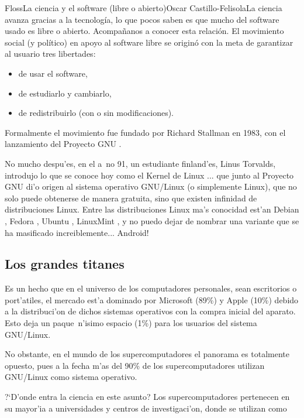 \begin{article}[2]{Floss}{La ciencia y el software (libre o abierto)}{Oscar Castillo-Felisola}{La ciencia avanza gracias a la tecnolog\'ia, lo que pocos saben es que mucho del software usado es libre o abierto. Acompa\~nanos a conocer esta relaci\'on.}
El movimiento social (y pol\'itico)  en apoyo al software libre se origin\'o con la meta de garantizar al usuario tres libertades:
\begin{itemize}%
\item de usar el software,
\item de estudiarlo y cambiarlo,
\item de redistribuirlo (con o sin modificaciones).
\end{itemize}%
Formalmente el movimiento fue fundado por Richard Stallman en 1983, con el lanzamiento del Proyecto GNU .

No mucho despu'es, en el  a~no 91, un estudiante finland'es, Linus Torvalds, introdujo lo que se conoce hoy como el Kernel de Linux ... que junto al Proyecto GNU di'o origen al sistema operativo GNU/Linux (o simplemente Linux), que no solo puede obtenerse de manera gratuita, sino que existen infinidad de distribuciones Linux. Entre las distribuciones Linux ma's conocidad est'an Debian , Fedora , Ubuntu , LinuxMint , y no puedo dejar de nombrar una variante que se ha masificado increiblemente... Android! 

\subsection{Los grandes titanes}


Es un hecho que en el universo de los computadores personales, sean escritorios o port'atiles, el mercado est'a dominado por Microsoft (89\%) y Apple (10\%) debido a la distribuci'on de dichos sistemas operativos con la compra inicial del aparato. Esto deja un paque~n'isimo espacio (1\%) para los usuarios del sistema GNU/Linux.

No obstante, en el mundo de los supercomputadores el panorama es totalmente opuesto, pues a la fecha m'as del 90\% de los supercomputadores utilizan GNU/Linux como sistema operativo.

?`D'onde entra la ciencia en este asunto? Los supercomputadores pertenecen en su mayor'ia a universidades y centros de investigaci'on, donde se utilizan como 


\end{article}
